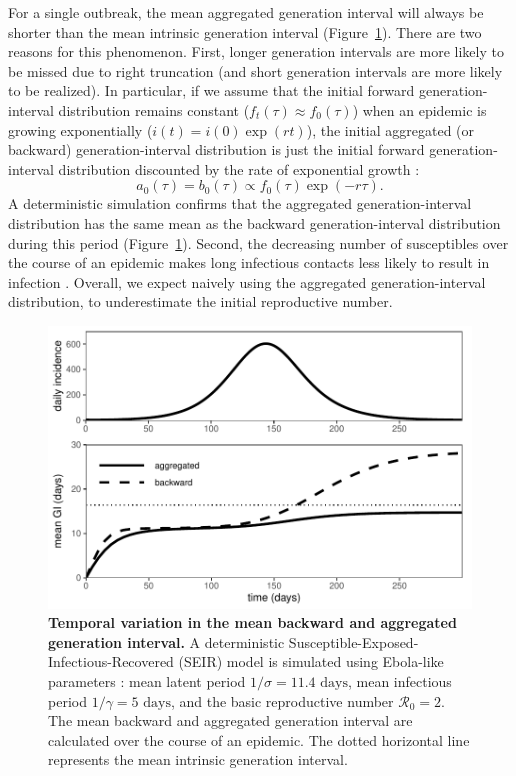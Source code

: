 \documentclass[12pt]{article}
\newcommand{\RR}{\ensuremath{{\mathcal R}}}
\begin{document}
For a single outbreak, the mean aggregated generation interval will always be shorter than the mean intrinsic generation interval (Figure~\ref{fig:censor}).
There are two reasons for this phenomenon.
First, longer generation intervals are more likely to be missed due to right truncation (and short generation intervals are more likely to be realized).
In particular, if we assume that the initial forward generation-interval distribution remains constant ($f_t(\tau) \approx f_0(\tau)$) when an epidemic is growing exponentially ($i(t) = i(0) \exp(rt)$), 
the initial aggregated (or backward) generation-interval distribution is just the initial forward generation-interval distribution discounted by the rate of exponential growth \citep{britton2019estimation}:
\begin{equation}
a_0(\tau) = b_0(\tau) \propto f_0(\tau) \exp(-r\tau).
\label{eq:exp}
\end{equation}
A deterministic simulation confirms that the aggregated generation-interval distribution has the same mean as the backward generation-interval distribution during this period (Figure~\ref{fig:censor}).
Second, the decreasing number of susceptibles over the course of an epidemic makes long infectious contacts less likely to result in infection \citep{champredon2015intrinsic}.
Overall, we expect naively using the aggregated generation-interval distribution, to underestimate the initial reproductive number.

\begin{figure}[!ht]
\includegraphics[width=\textwidth]{../fig/temporal_effect.pdf}
\caption{\textbf{Temporal variation in the mean backward and aggregated generation interval.}
A deterministic Susceptible-Exposed-Infectious-Recovered (SEIR) model is simulated using Ebola-like parameters \citep{who2014ebola}: mean latent period $1/\sigma = 11.4 \textrm{ days}$, mean infectious period $1/\gamma = 5 \textrm{ days}$, and the basic reproductive number $\RR_0 = 2$. 
The mean backward and aggregated generation interval are calculated over the course of an epidemic.
The dotted horizontal line represents the mean intrinsic generation interval.
}
\label{fig:censor}
\end{figure}
\end{document}
